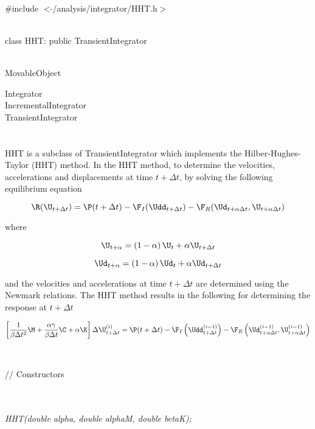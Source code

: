 
   \\
\#include $<\tilde{ }$/analysis/integrator/HHT.h$>$  


  \\
class HHT: public TransientIntegrator  


 \\
MovableObject 

\indent\indent Integrator \\
\indent\indent\indent IncrementalIntegrator \\
\indent\indent\indent\indent TransientIntegrator \\
\indent\indent\indent\indent{} \\

 \\ 
\indent HHT is a subclass of TransientIntegrator which implements
the Hilber-Hughes-Taylor (HHT) method. In the HHT method, to determine the
velocities, accelerations and displacements at time $t + \Delta t$,
by solving the following equilibrium equation

\[ \R (\U_{t + \Delta t}) = \P(t + \Delta t) -
\F_I(\Udd_{t+\Delta t}) - \F_R(\Ud_{t + \alpha \Delta t},\U_{t +
\alpha \Delta t}) \] 

\noindent where

\[ \U_{t + \alpha} = \left( 1 - \alpha \right) \U_t + \alpha \U_{t +
\Delta t} \]

\[ \Ud_{t + \alpha} = \left( 1 - \alpha \right) \Ud_t + \alpha \Ud_{t +
\Delta t} \]

\noindent and the velocities and accelerations at time $t + \Delta t$
are determined using the Newmark relations. The HHT method results in
the following for determining the response at $t + \Delta t$

\[ \left[ \frac{1}{\beta \Delta t^2} \M + \frac{\alpha \gamma}{\beta
\Delta t} \C + \alpha \K \right] \Delta \U_{t + \Delta t}^{(i)} = \P(t
+ \Delta t) - \F_I\left(\Udd_{t+\Delta  t}^{(i-1)}\right)
- \F_R\left(\Ud_{t + \alpha \Delta t}^{(i-1)},\U_{t + \alpha \Delta
t}^{(i-1)}\right) \] 
\\

 \\
// Constructors 

\\ 
\\ 
{\em HHT(double alpha, double alphaM, double betaK);}\\ 


